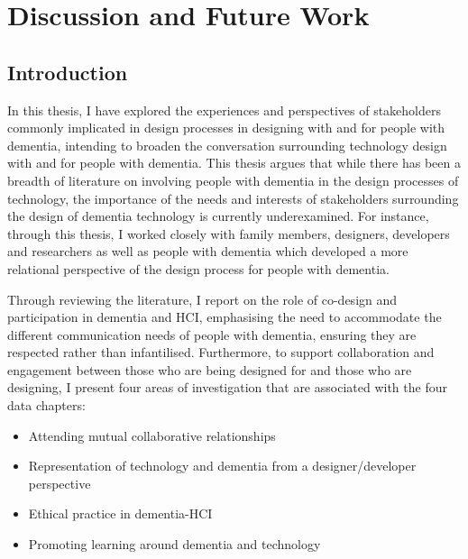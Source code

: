 \chapter{Discussion and Future Work}
\label{Discussion}

\section{Introduction}
\label{Discussion:Intro}

In this thesis, I have explored the experiences and perspectives of stakeholders commonly implicated in design processes in designing with and for people with dementia, intending to broaden the conversation surrounding technology design with and for people with dementia. This thesis argues that while there has been a breadth of literature on involving people with dementia in the design processes of technology, the importance of the needs and interests of stakeholders surrounding the design of dementia technology is currently underexamined. For instance, through this thesis, I worked closely with family members, designers, developers and researchers as well as people with dementia which developed a more relational perspective of the design process for people with dementia.

Through reviewing the literature, I report on the role of co-design and participation in dementia and HCI, emphasising the need to accommodate the different communication needs of people with dementia, ensuring they are respected rather than infantilised. Furthermore, to support collaboration and engagement between those who are being designed for and those who are designing, I present four areas of investigation that are associated with the four data chapters: 
\begin{itemize}
    \item Attending mutual collaborative relationships
    \item Representation of technology and dementia from a designer/developer perspective
    \item Ethical practice in dementia-HCI
    \item Promoting learning around dementia and technology
\end{itemize}

